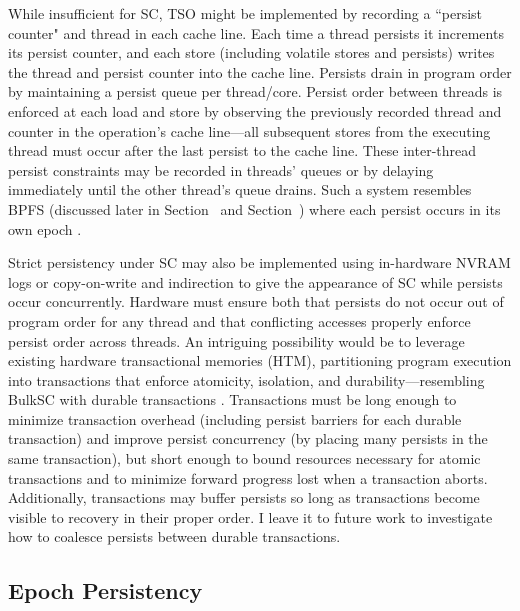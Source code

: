 While insufficient for SC, TSO might be implemented by recording a ``persist counter" and thread in each cache line.
Each time a thread persists it increments its persist counter, and each store (including volatile stores and persists) writes the thread and persist counter into the cache line.
Persists drain in program order by maintaining a persist queue per thread/core.
Persist order between threads is enforced at each load and store by observing the previously recorded thread and counter in the operation's cache line---all subsequent stores from the executing thread must occur after the last persist to the cache line.
These inter-thread persist constraints may be recorded in threads' queues or by delaying immediately until the other thread's queue drains.
Such a system resembles BPFS (discussed later in Section~ and Section~) where each persist occurs in its own epoch \cite{Condit09}.

Strict persistency under SC may also be implemented using in-hardware NVRAM logs or copy-on-write and indirection to give the appearance of SC while persists occur concurrently.
Hardware must ensure both that persists do not occur out of program order for any thread and that conflicting accesses properly enforce persist order across threads.
An intriguing possibility would be to leverage existing hardware transactional memories (HTM), partitioning program execution into transactions that enforce atomicity, isolation, and durability---resembling BulkSC with durable transactions .
Transactions must be long enough to minimize transaction overhead (including persist barriers for each durable transaction) and improve persist concurrency (by placing many persists in the same transaction), but short enough to bound resources necessary for atomic transactions and to minimize forward progress lost when a transaction aborts.
Additionally, transactions may buffer persists so long as transactions become visible to recovery in their proper order.
I leave it to future work to investigate how to coalesce persists between durable transactions.

\subsection{Epoch Persistency}
\label{section:PersistencyModels:PersistEpochs}

